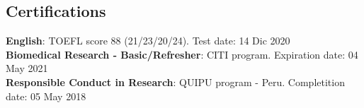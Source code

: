\documentclass[margin,line]{res}
\begin{document}
\begin{resume}
\section{\sc Certifications}
{\bf English}: TOEFL score 88 (21/23/20/24). \hfill Test date: 14 Dic 2020\\
{\bf Biomedical Research - Basic/Refresher}: CITI program. \hfill Expiration date: 04 May 2021\\
{\bf Responsible Conduct in Research}: QUIPU program - Peru. \hfill Completition date: 05 May 2018%







\end{resume}
\end{document}
